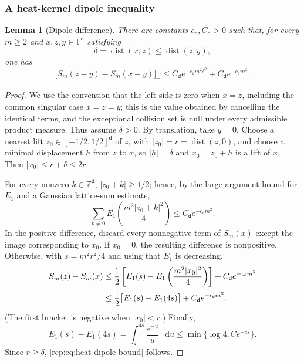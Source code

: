 \documentclass[11pt,reqno]{amsart}
\numberwithin{equation}{section}
\theoremstyle{plain}
\newtheorem{lemma}[lemma]{Lemma}
\theoremstyle{definition}
\renewcommand{\d}{\mathsf d}
\newcommand{\dd}{\mathop{}\!\mathrm d}
\newcommand{\T}{\mathbb T}
\newcommand{\Z}{\mathbb Z}
\begin{document}
\subsubsection{A heat-kernel dipole inequality}

\begin{lemma}[Dipole difference]\label{rep:lem:heat-dipole}
There are constants $c_{\d},C_{\d}>0$ such that, for every $m\ge2$ and $x,z,y\in\T^{\d}$ satisfying
\begin{equation}\label{rep:eq:dipole-assumption}
 \delta=\operatorname{dist}(x,z)\le\operatorname{dist}(z,y),
\end{equation}
one has
\begin{equation}\label{rep:eq:heat-dipole-bound}
 \bigl[S_m(z-y)-S_m(x-y)\bigr]_+
 \le C_{\d}e^{-c_{\d}m^2\delta^2}+C_{\d}e^{-c_{\d}m^2}.
\end{equation}
\end{lemma}

\begin{proof}
We use the convention that the left side is zero when $x=z$, including the common singular case $x=z=y$; this is the value obtained by cancelling the identical terms, and the exceptional collision set is null under every admissible product measure.  Thus assume $\delta>0$.  By translation, take $y=0$.  Choose a nearest lift $z_0\in[-1/2,1/2]^{\d}$ of $z$, with $|z_0|=r=\operatorname{dist}(z,0)$, and choose a minimal displacement $h$ from $z$ to $x$, so $|h|=\delta$ and $x_0=z_0+h$ is a lift of $x$.  Then $|x_0|\le r+\delta\le2r$.

For every nonzero $k\in\Z^{\d}$, $|z_0+k|\ge1/2$; hence, by the large-argument bound for $E_1$ and a Gaussian lattice-sum estimate,
\begin{equation}\label{rep:eq:dipole-image-tail}
 \sum_{k\ne0}E_1\left(\frac{m^2|z_0+k|^2}{4}\right)
 \le C_{\d}e^{-c_{\d}m^2}.
\end{equation}
In the positive difference, discard every nonnegative term of $S_m(x)$ except the image corresponding to $x_0$.  If $x_0=0$, the resulting difference is nonpositive.  Otherwise, with $s=m^2r^2/4$ and using that $E_1$ is decreasing,
\begin{align}
 S_m(z)-S_m(x)
 &\le\frac12\left[E_1(s)-E_1\left(\frac{m^2|x_0|^2}{4}\right)\right]
 +C_{\d}e^{-c_{\d}m^2}\notag\\
 &\le\frac12\bigl[E_1(s)-E_1(4s)\bigr]+C_{\d}e^{-c_{\d}m^2}.
 \label{rep:eq:dipole-E1-step}
\end{align}
(The first bracket is negative when $|x_0|<r$.)  Finally,
\begin{equation}\label{rep:eq:E1-fourfold}
 E_1(s)-E_1(4s)=\int_s^{4s}\frac{e^{-u}}u\,\dd u
 \le\min\{\log4,Ce^{-cs}\}.
\end{equation}
Since $r\ge\delta$, \eqref{rep:eq:heat-dipole-bound} follows.
\end{proof}
\end{document}
